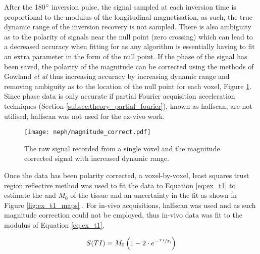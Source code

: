 After the 180$\degree$ inversion pulse, the signal sampled at each inversion time is proportional to the modulus of the longitudinal magnetisation, as such, the true dynamic range of the inversion recovery is not sampled. There is also ambiguity as to the polarity of signals near the null point (zero crossing) which can lead to a decreased accuracy when fitting for \tone as any algorithm is essentially having to fit an extra parameter in the form of the null point. If the phase of the signal has been saved, the polarity of the magnitude can be corrected using the methods of Gowland \textit{et al} \cite{gowland_simple_1991, szumowski_signal_2012} thus increasing accuracy by increasing dynamic range and removing ambiguity as to the location of the null point for each voxel, Figure \ref{fig:ex_sig_mag_correction}. Since phase data is only accurate if partial Fourier acquisition acceleration techniques (Section \ref{subsec:theory_partial_fourier}), known as halfscan, are not utilised, halfscan was not used for the ex-vivo work.

\begin{figure}[H]
	\centering
	\texttt{[image: neph/magnitude\_correct.pdf]}
	\caption{The raw signal recorded from a single voxel and the magnitude corrected signal with increased dynamic range.}
	\label{fig:ex_sig_mag_correction}	
\end{figure}

Once the data has been polarity corrected, a voxel-by-voxel, least squares trust region reflective method was used to fit the data to Equation \eqref{eq:ex_t1} to estimate the \tone and $M_0$ of the tissue and an uncertainty in the fit as shown in Figure \ref{fig:ex_t1_maps} \cite{branch_subspace_1999}. For in-vivo acquisitions, halfscan was used and as such magnitude correction could not be employed, thus in-vivo data was fit to the modulus of Equation \eqref{eq:ex_t1}.

\begin{equation}
	S(TI) = M_0\left(1-2 \cdot e^{-\sfrac{TI}{T_1}}\right)
	\label{eq:ex_t1}
\end{equation}
 
